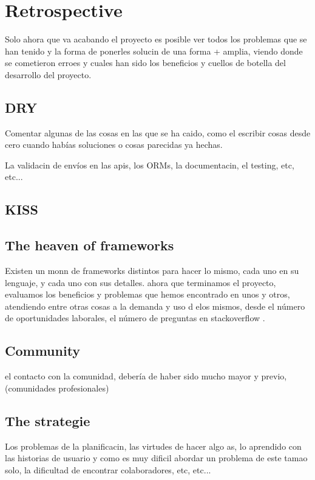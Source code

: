 \documentclass[oneside,english,titlepage]{scrbook}
\begin{document}
\chapter{Retrospective}

Solo ahora que va acabando el proyecto es posible ver todos los problemas
que se han tenido y la forma de ponerles solucin de una forma +
amplia, viendo donde se cometieron erroes y cuales han sido los beneficios
y cuellos de botella del desarrollo del proyecto.

\section{DRY}

Comentar algunas de las cosas en las que se ha caido, como el escribir
cosas desde cero cuando habías soluciones o cosas parecidas ya hechas.

La validacin de envíos en las apis, los ORMs, la documentacin, el
testing, etc, etc...

\section{KISS}

\section{The heaven of frameworks}

Existen un monn de frameworks distintos para hacer lo mismo, cada
uno en su lenguaje, y cada uno con sus detalles. ahora que terminamos
el proyecto, evaluamos los beneficios y problemas que hemos encontrado
en unos y otros, atendiendo entre otras cosas a la demanda y uso d
elos mismos, desde el número de oportunidades laborales, el número
de preguntas en stackoverflow .

\section{Community}

el contacto con la comunidad, debería de haber sido mucho mayor y
previo, (comunidades profesionales)

\section{The strategie}

Los problemas de la planificacin, las virtudes de hacer algo as,
lo aprendido con las historias de usuario y como es muy dificil abordar
un problema de este tamao solo, la dificultad de encontrar colaboradores,
etc, etc...
\end{document}
